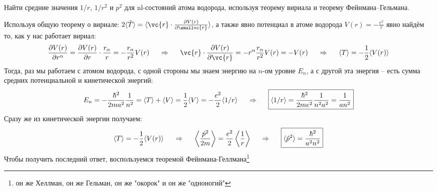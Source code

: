 \begin{leftrules}
	Найти средние значения $1/r$, $1/r^2$ и $p^2$ для nl-состояний атома водорода,
	используя теорему вириала и теорему Фейнмана–Гельмана.
\end{leftrules}
Используя общую теорему о вириале: $2 \langle \hat{T} \rangle = \langle \vc{r} \cdot \tfrac{\partial V(r)}{\partial \smallvc{r}}\rangle$, а также явно потенциал в атоме водорода $V(r) = -\tfrac{e^2}{r}$ явно найдём то, как у нас работает вириал:
\begin{equation*}
	\frac{\partial V(r)}{\partial r^\alpha} 
	= \frac{\partial V(r)}{\partial r} \cdot \frac{r_\alpha}{r} 
	= - \frac{r_\alpha}{r^2} V(r)
	\hspace{0.5 cm}
	\Rightarrow
	\hspace{0.5 cm}
	\vc{r} \cdot \frac{\partial V(r)}{\partial \vc{r}} = - r^\alpha \frac{r_\alpha}{r^2} V(r) = - V(r)
	\hspace{0.5 cm}
	\Rightarrow
	\hspace{0.5 cm}
	\langle  T\rangle = - \frac{1}{2} \langle V(r)\rangle
\end{equation*}
Тогда, раз мы работаем с атомом водорода, с одной стороны мы знаем энергию на $n$-ом уровне $E_n$, а с другой эта энергия -- есть сумма средних потенциальной и кинетической энергий: 
\begin{equation*}
 	E_n = - \frac{\hbar^2}{2 m a^2}\frac{1}{n^2} = \langle T\rangle + \langle  V \rangle = \frac{1}{2} \langle V \rangle = - \frac{e^2}{2} \langle 1/r\rangle
 	\hspace{0.5 cm}
 	\Rightarrow
 	\hspace{0.5 cm}
 	\boxed{\langle 1/r\rangle = \frac{\hbar^2}{2 m e^2} \frac{1}{n^2 a^2} = \frac{1}{a n^2}}
 \end{equation*} 
 Сразу же из кинетической энергии получаем:
 \begin{equation*}
 	\langle  T\rangle = - \frac{1}{2} \langle V(r)\rangle \hspace{0.5 cm}
 	\Rightarrow
 	\hspace{0.5 cm}
 	\left\langle \frac{\hat{p}^2}{2m}\right\rangle = \frac{e^2}{2} \left\langle \frac{1}{r}\right\rangle
 	\hspace{0.5 cm}
 	\Rightarrow
 	\hspace{0.5 cm}
 	\boxed{\langle \hat{p}^2\rangle = \frac{\hbar^2}{a^2 n^2}}
 \end{equation*}
 Чтобы получить последний ответ, воспользуемся теоремой Фейнмана-Геллмана\footnote{он же Хеллман, он же Гельман, он же "окорок" и он же "одноногий"}
